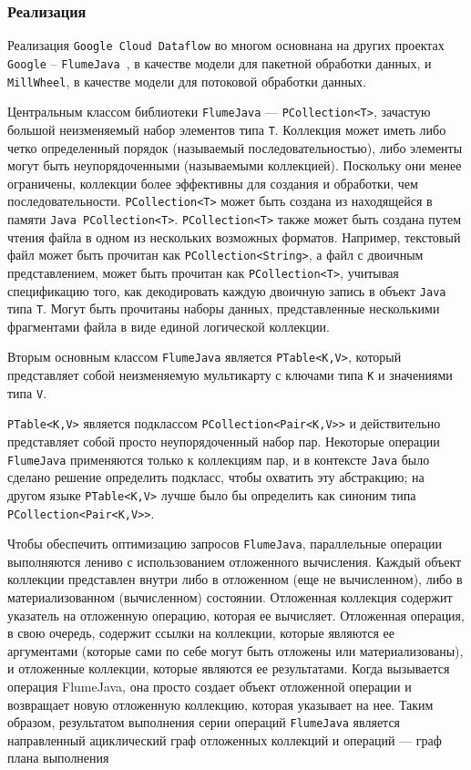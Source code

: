 \subsubsection{Реализация}

Реализация \texttt{Google Cloud Dataflow} во многом основнана на других проектах \texttt{Google} -- \texttt{FlumeJava}~\cite{flumejava}, в качестве модели для пакетной обработки данных, и \texttt{MillWheel}, в качестве модели для потоковой обработки данных.

Центральным классом библиотеки \texttt{FlumeJava} --- \texttt{PCollection<T>}, зачастую большой неизменяемый набор элементов типа \texttt{T}. Коллекция может иметь либо четко определенный порядок (называемый последовательностью), либо элементы могут быть неупорядоченными (называемыми коллекцией). Поскольку они менее ограничены, коллекции более эффективны для создания и обработки, чем последовательности. \texttt{PCollection<T>} может быть создана из находящейся в памяти \texttt{Java PCollection<T>}. \texttt{PCollection<T>} также может быть создана путем чтения файла в одном из нескольких возможных форматов. Например, текстовый файл может быть прочитан как \texttt{PCollection<String>}, а файл с двоичным представлением, может быть прочитан как \texttt{PCollection<T>}, учитывая спецификацию того, как декодировать каждую двоичную запись в объект \texttt{Java} типа \texttt{T}. Могут быть прочитаны наборы данных, представленные несколькими фрагментами файла в виде единой логической коллекции.

Вторым основным классом \texttt{FlumeJava} является \texttt{PTable<K,V>}, который представляет собой неизменяемую мультикарту с ключами типа \texttt{K} и значениями типа \texttt{V}. 

\texttt{PTable<K,V>} является подклассом \texttt{PCollection<Pair<K,V>>} и действительно представляет собой просто неупорядоченный набор пар. Некоторые операции \texttt{FlumeJava} применяются только к коллекциям пар, и в контексте \texttt{Java} было сделано решение определить подкласс, чтобы охватить эту абстракцию; на другом языке \texttt{PTable<K,V>} лучше было бы определить как синоним типа \texttt{PCollection<Pair<K,V>>}.

Чтобы обеспечить оптимизацию запросов \texttt{FlumeJava}, параллельные операции  выполняются лениво с использованием отложенного вычисления. 
Каждый объект коллекции представлен внутри либо в отложенном (еще не вычисленном), либо в материализованном (вычисленном) состоянии. 
Отложенная коллекция содержит указатель на отложенную операцию, которая ее вычисляет. 
Отложенная операция, в свою очередь, содержит ссылки на коллекции, которые являются ее аргументами (которые сами по себе могут быть отложены или материализованы), и отложенные коллекции, которые являются ее результатами. Когда вызывается операция FlumeJava, она просто создает объект отложенной операции и возвращает новую отложенную коллекцию, которая указывает на нее. 
Таким образом, результатом выполнения серии операций \texttt{FlumeJava} является направленный ациклический граф отложенных коллекций и операций --- граф плана выполнения

